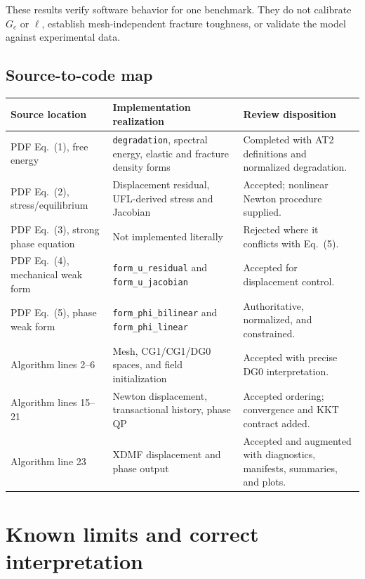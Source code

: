 \documentclass[11pt,a4paper]{article}
\newcommand{\code}[1]{\texttt{#1}}
\begin{document}
These results verify software behavior for one benchmark. They do not calibrate
$G_c$ or $\ell$, establish mesh-independent fracture toughness, or validate the
model against experimental data.

\subsection{Source-to-code map}

\begin{tabularx}{\textwidth}{@{}L{38mm}L{61mm}Y@{}}
\toprule
\textbf{Source location} & \textbf{Implementation realization} &
\textbf{Review disposition} \\
\midrule
PDF Eq.~(1), free energy & \code{degradation}, spectral energy, elastic and
fracture density forms & Completed with AT2 definitions and normalized
degradation. \\
PDF Eq.~(2), stress/equilibrium & Displacement residual, UFL-derived stress and
Jacobian & Accepted; nonlinear Newton procedure supplied. \\
PDF Eq.~(3), strong phase equation & Not implemented literally & Rejected where
it conflicts with Eq.~(5). \\
PDF Eq.~(4), mechanical weak form & \code{form\_u\_residual} and
\code{form\_u\_jacobian} & Accepted for displacement control. \\
PDF Eq.~(5), phase weak form & \code{form\_phi\_bilinear} and
\code{form\_phi\_linear} & Authoritative, normalized, and constrained. \\
Algorithm lines 2--6 & Mesh, CG1/CG1/DG0 spaces, and field initialization &
Accepted with precise DG0 interpretation. \\
Algorithm lines 15--21 & Newton displacement, transactional history, phase QP &
Accepted ordering; convergence and KKT contract added. \\
Algorithm line 23 & XDMF displacement and phase output & Accepted and augmented
with diagnostics, manifests, summaries, and plots. \\
\bottomrule
\end{tabularx}

\section{Known limits and correct interpretation}
\end{document}
